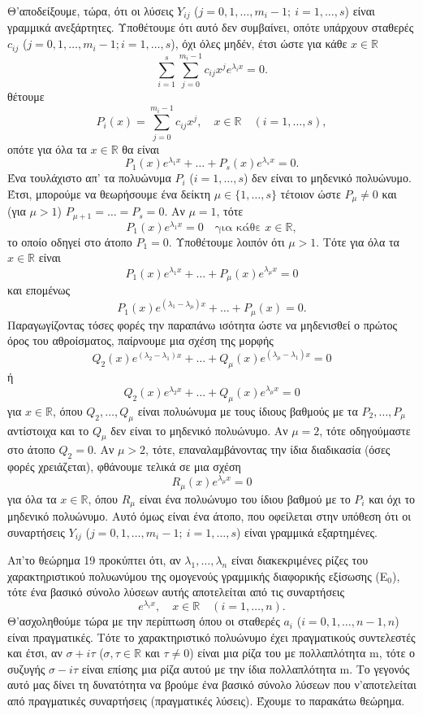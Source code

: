 \documentclass[11pt,a4paper,twoside]{book}
\begin{document}
Θ'αποδείξουμε, τώρα, ότι οι λύσεις $Y_{ij}$ ($j=0,1,\dots,m_i-1; \ i=1,\dots,s$) είναι γραμμικά ανεξάρτητες. Υποθέτουμε ότι αυτό δεν συμβαίνει, οπότε υπάρχουν σταθερές $c_{ij}$ ($j=0,1,\dots,m_i-1; i=1,\dots,s$), όχι όλες μηδέν, έτσι ώστε για κάθε $x\in\mathbb{R}$
\[
    \sum_{i=1}^s \sum_{j=0}^{m_i-1} c_{ij} x^j e^{\lambda_i x} = 0.
\]
θέτουμε
\[
    P_i(x) = \sum_{j=0}^{m_i-1} c_{ij}x^j, \quad x\in\mathbb{R} \quad (i=1,\dots,s),
\]
οπότε για όλα τα $x\in\mathbb{R}$ θα είναι
\[
    P_1(x)e^{\lambda_1 x} + \dots + P_s(x)e^{\lambda_s x} = 0.
\]
Ένα τουλάχιστο απ' τα πολυώνυμα $P_i$ ($i=1,\dots,s$) δεν είναι το μηδενικό πολυώνυμο. Έτσι, μπορούμε να θεωρήσουμε ένα δείκτη $\mu\in\{1,\dots,s\}$ τέτοιον ώστε $P_\mu \neq 0$ και (για $\mu>1$) $P_{\mu+1}=\dots=P_s=0$. Αν $\mu=1$, τότε
\[
    P_1(x)e^{\lambda_1 x} = 0 \quad \text{για κάθε } x\in\mathbb{R},
\]
το οποίο οδηγεί στο άτοπο $P_1=0$. Υποθέτουμε λοιπόν ότι $\mu>1$. Τότε για όλα τα $x\in\mathbb{R}$ είναι
\[
    P_1(x)e^{\lambda_1 x} + \dots + P_\mu(x)e^{\lambda_\mu x} = 0
\]
και επομένως
\[
    P_1(x)e^{(\lambda_1-\lambda_\mu)x} + \dots + P_\mu(x) = 0.
\]
Παραγωγίζοντας τόσες φορές την παραπάνω ισότητα ώστε να μηδενισθεί ο πρώτος όρος του αθροίσματος, παίρνουμε μια σχέση της μορφής
\[
    Q_2(x)e^{(\lambda_2-\lambda_1)x} + \dots + Q_\mu(x)e^{(\lambda_\mu-\lambda_1)x} = 0
\]
ή
\[
    Q_2(x)e^{\lambda_2 x} + \dots + Q_\mu(x)e^{\lambda_\mu x} = 0
\]
για $x\in\mathbb{R}$, όπου $Q_2, \dots, Q_\mu$ είναι πολυώνυμα με τους ίδιους βαθμούς με τα $P_2, \dots, P_\mu$ αντίστοιχα και το $Q_\mu$ δεν είναι το μηδενικό πολυώνυμο. Αν $\mu=2$, τότε οδηγούμαστε στο άτοπο $Q_2=0$. Αν $\mu>2$, τότε, επαναλαμβάνοντας την ίδια διαδικασία (όσες φορές χρειάζεται), φθάνουμε τελικά σε μια σχέση
\[
    R_\mu(x)e^{\lambda_\mu x} = 0
\]
για όλα τα $x\in\mathbb{R}$, όπου $R_\mu$ είναι ένα πολυώνυμο του ίδιου βαθμού με
το $P_i$ και όχι το μηδενικό πολυώνυμο. Αυτό όμως είναι ένα άτοπο, που οφείλεται στην υπόθεση ότι οι συναρτήσεις $Y_{ij}$ ($j=0,1,\dots,m_i-1; \ i=1,\dots,s$) είναι γραμμικά εξαρτημένες.

Απ'το θεώρημα 19 προκύπτει ότι, αν $\lambda_1, \dots, \lambda_n$ είναι διακεκριμένες ρίζες του χαρακτηριστικού πολυωνύμου της ομογενούς γραμμικής διαφορικής εξίσωσης (Ε$_0$), τότε ένα βασικό σύνολο λύσεων αυτής αποτελείται από τις συναρτήσεις
\[
    e^{\lambda_i x}, \quad x\in\mathbb{R} \quad (i=1,\dots,n).
\]
Θ'ασχοληθούμε τώρα με την περίπτωση όπου οι σταθερές $a_i$ ($i=0,1,\dots,n-1,n$) είναι πραγματικές. Τότε το χαρακτηριστικό πολυώνυμο έχει πραγματικούς συντελεστές και έτσι, αν $\sigma+i\tau$ ($\sigma, \tau\in\mathbb{R}$ και $\tau\neq 0$) είναι μια ρίζα του με πολλαπλότητα m, τότε ο συζυγής $\sigma-i\tau$ είναι επίσης μια ρίζα αυτού με την ίδια πολλαπλότητα m. Το γεγονός αυτό μας δίνει τη δυνατότητα να βρούμε ένα βασικό σύνολο λύσεων που ν'αποτελείται από πραγματικές συναρτήσεις (πραγματικές λύσεις). Έχουμε το παρακάτω θεώρημα.
\end{document}
